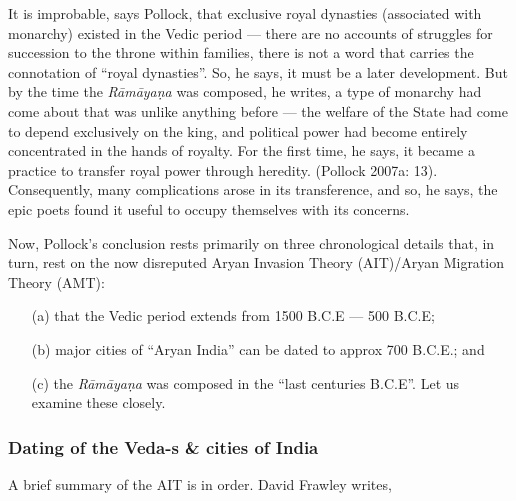 It is improbable, says Pollock, that exclusive royal dynasties (associated with monarchy) existed in the Vedic period --- there are no accounts of struggles for succession to the throne within families, there is not a word that carries the connotation of “royal dynasties”. So, he says, it must be a later development. But by the time the {\sl Rāmāyaṇa} was composed, he writes, a type of monarchy had come about that was unlike anything before --- the welfare of the State had come to depend exclusively on the king, and political power had become entirely concentrated in the hands of royalty. For the first time, he says, it became a practice to transfer royal power through heredity. (Pollock 2007a: 13). Consequently, many complications arose in its transference, and so, he says, the epic poets found it useful to occupy themselves with its concerns.

Now, Pollock’s conclusion rests primarily on three chronological details that, in turn, rest on the now disreputed Aryan Invasion Theory (AIT)/Aryan Migration Theory (AMT):

\newpage

\begin{itemize}
\item[(a)] that the Vedic period extends from 1500 B.C.E --- 500 B.C.E; 

\item[(b)] major cities of “Aryan India” can be dated to approx 700 B.C.E.; and

\item[(c)] the {\sl Rāmāyaṇa} was composed in the “last centuries B.C.E”. Let us examine these closely. 
\end{itemize}

\subsubsection{Dating of the Veda-s \& cities of India}\label{sec1.1.2.1}

A brief summary of the AIT is in order. David Frawley writes, 


